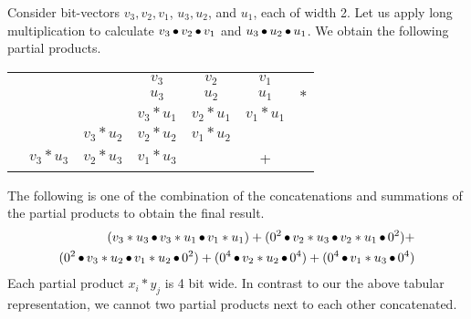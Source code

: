 \begin{example}
  Consider bit-vectors $v_3,v_2,v_1$,  $u_3,u_2$, and $u_1$, each of width 2.
  Let us apply long multiplication to calculate
  $v_3 \mathop{\bullet} v_2 \mathop{\bullet} v_1$ and $u_3 \mathop{\bullet} u_2 \mathop{\bullet} u_1$.
  We obtain the following partial products.
\begin{center}
\begin{tabular}{c@{\quad}c@{\quad}c@{\quad}c@{\quad}c@{\quad}c@{\quad}c}
  &&& $v_3$ & $v_2$ & $v_1$&\\ 
  &&& $u_3$ & $u_2$ & $u_1$&$*$\\ \hline
  &&& $v_3*u_1$ & $v_2*u_1$ & $v_1*u_1$&\\
  && $v_3*u_2$ & $v_2*u_2$ & $v_1*u_2$ && \\
  & $v_3*u_3$ & $v_2*u_3$ &$v_1*u_3$&  & +&\\\hline
\end{tabular}
\end{center}
The following is one of the combination
of the concatenations and summations of the partial products
to obtain the final result.
\begin{align*}
  (v_3*u_3 \mathop{\bullet} v_3*u_1 \mathop{\bullet} v_1*u_1) +
  (0^2 \mathop{\bullet} v_2*u_3 \mathop{\bullet} v_2*u_1 \mathop{\bullet} 0^2) +\\
  (0^2 \mathop{\bullet} v_3*u_2 \mathop{\bullet} v_1*u_2 \mathop{\bullet} 0^2) +
  (0^4 \mathop{\bullet} v_2*u_2 \mathop{\bullet} 0^4) + (0^4 \mathop{\bullet} v_1*u_3 \mathop{\bullet} 0^4)
\end{align*}
%
Each partial product $x_i * y_j$ is 4 bit wide.
%
In contrast to our the above tabular representation, we cannot
two partial products next to each other concatenated.


\end{example}


